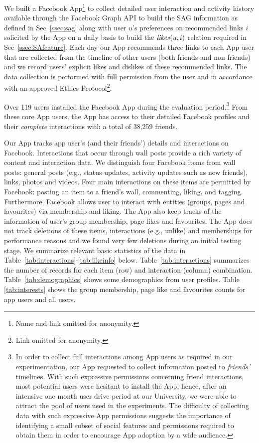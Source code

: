 
We built a Facebook App\footnote{Name and link omitted
for anonymity.} to collect detailed user
interaction and activity history available through the Facebook Graph
API to build the SAG information as defined in Sec~\ref{ssec:sag}
along with user $u$'s preferences on recommended links $i$ solicited by the App on a daily basis
to build the $\likes(u,i)$ relation required in Sec~\ref{ssec:SAfeature}.
Each day our App recommends three links to each App user 
that are collected from the timeline of other users (both friends and
non-friends) and we record users' explicit likes and dislikes of these
recommended links.  The
data collection is performed with full permission from the user and in
accordance with an approved Ethics Protocol\footnote{Link omitted for
anonymity.}.

Over 119 users installed the Facebook App during the evaluation
period.\footnote{In order to collect full interactions among App users
as required in our experimentation, our App requested to collect
information posted to \emph{friends'} timelines.  With such expressive
permissions concerning friend interactions, most potential users were
hesitant to install the App; hence, after an intensive one month user drive period
at our University, we were able to attract the pool of users used in the experiments.  The difficulty
of collecting data with such expressive App permissions suggests the importance
of identifying a small subset of social features and permissions required to 
obtain them in order to encourage App adoption by a wide audience.}
From these core App users, the App has access to their detailed
Facebook profiles and their \emph{complete} interactions with a total of 38,259
friends.

Our App tracks app user's (and their friends') details and
interactions on Facebook.  Interactions that occur through wall posts
provide a rich variety of content and interaction data.  We
distinguish four Facebook items from wall posts: general posts (e.g.,
status updates, activity updates such as new friends), links, photos
and videos. Four main interactions on these items are permitted by
Facebook: posting an item to a friend's wall, commenting, liking, and
tagging. Furthermore, Facebook allows user to interact with entities
(groups, pages and favourites) via membership and liking. The App also
keep tracks of the information of user's group membership, page likes
and favourites.  The App does not track deletions of these items,
interactions (e.g., unlike) and memberships for performance reasons
and we found very few deletions during an initial testing stage.  We
summarize relevant basic statistics of the data in
Table~\ref{tab:interactions}-\ref{tab:likeinfo} below.
Table~\ref{tab:interactions} summarizes the number of records for each
item (row) and interaction (column)
combination. Table~\ref{tab:demographics} shows some demographics from
user profiles. Table \ref{tab:interests} shows the group membership,
page like and favourites counts for app users and all users.

